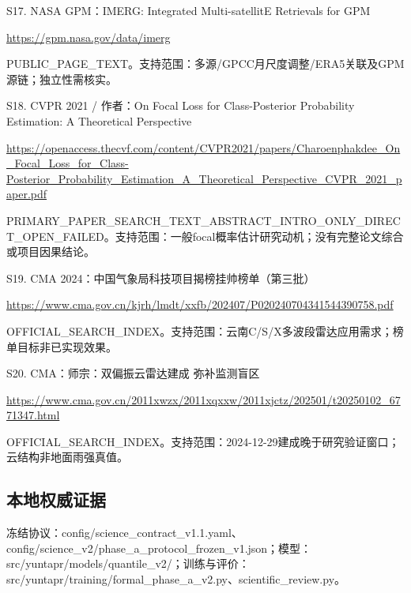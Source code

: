 \documentclass[UTF8,fontset=fandol,10pt]{ctexart}
\begin{document}
S17. NASA GPM：IMERG: Integrated Multi-satellitE Retrievals for GPM\par\url{https://gpm.nasa.gov/data/imerg}\par PUBLIC\_\allowbreak{}PAGE\_\allowbreak{}TEXT。支持范围：多源/\allowbreak{}GPCC月尺度调整/\allowbreak{}ERA5关联及GPM源链；独立性需核实。\par\medskip

S18. CVPR 2021 /\allowbreak{} 作者：On Focal Loss for Class-Posterior Probability Estimation: A Theoretical Perspective\par\url{https://openaccess.thecvf.com/content/CVPR2021/papers/Charoenphakdee_On_Focal_Loss_for_Class-Posterior_Probability_Estimation_A_Theoretical_Perspective_CVPR_2021_paper.pdf}\par PRIMARY\_\allowbreak{}PAPER\_\allowbreak{}SEARCH\_\allowbreak{}TEXT\_\allowbreak{}ABSTRACT\_\allowbreak{}INTRO\_\allowbreak{}ONLY\_\allowbreak{}DIRECT\_\allowbreak{}OPEN\_\allowbreak{}FAILED。支持范围：一般focal概率估计研究动机；没有完整论文综合或项目因果结论。\par\medskip

S19. CMA 2024：中国气象局科技项目揭榜挂帅榜单（第三批）\par\url{https://www.cma.gov.cn/kjrh/lmdt/xxfb/202407/P020240704341544390758.pdf}\par OFFICIAL\_\allowbreak{}SEARCH\_\allowbreak{}INDEX。支持范围：云南C/\allowbreak{}S/\allowbreak{}X多波段雷达应用需求；榜单目标非已实现效果。\par\medskip

S20. CMA：师宗：双偏振云雷达建成 弥补监测盲区\par\url{https://www.cma.gov.cn/2011xwzx/2011xqxxw/2011xjctz/202501/t20250102_6771347.html}\par OFFICIAL\_\allowbreak{}SEARCH\_\allowbreak{}INDEX。支持范围：2024-12-29建成晚于研究验证窗口；云结构非地面雨强真值。\par\medskip

\subsection{本地权威证据}

冻结协议：config/\allowbreak{}science\_\allowbreak{}contract\_\allowbreak{}v1.1.yaml、config/\allowbreak{}science\_\allowbreak{}v2/\allowbreak{}phase\_\allowbreak{}a\_\allowbreak{}protocol\_\allowbreak{}frozen\_\allowbreak{}v1.json；模型：src/\allowbreak{}yuntapr/\allowbreak{}models/\allowbreak{}quantile\_\allowbreak{}v2/\allowbreak{}；训练与评价：src/\allowbreak{}yuntapr/\allowbreak{}training/\allowbreak{}formal\_\allowbreak{}phase\_\allowbreak{}a\_\allowbreak{}v2.py、scientific\_\allowbreak{}review.py。
\end{document}
